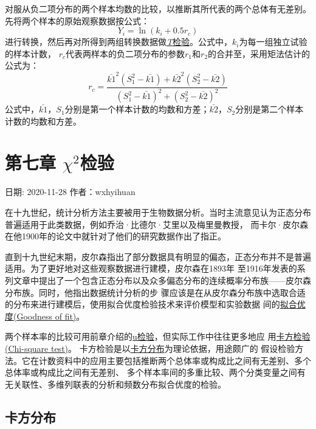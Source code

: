 \documentclass[
]{article}
\begin{document}
对服从负二项分布的两个样本均数的比较，以推断其所代表的两个总体有无差别。先将两个样本的原始观察数据按公式：
\[Y_i=\ln(k_i+0.5r_c)\]
进行转换，然后再对所得到两组转换数据做\protect\hyperlink{ux5355ux6837ux672ctux68c0ux9a8c}{\emph{T}检验}。公式中，\(k_i\)为每一组独立试验的样本计数，
\(r_c\)代表两样本的负二项分布的参数\(r_1\)和\(r_2\)的合并至，采用矩法估计的公式为：
\[r_c=\frac{\bar{k1}^2(S_1^2-\bar{k1})+\bar{k2}^2(S_2^2-\bar{k2})}{(S_1^2-\bar{k1})^2+(S_2^2-\bar{k2})^2}\]
公式中，\(\bar{k1}，S_1\)分别是第一个样本计数的均数和方差；\(\bar{k2}，S_2\)分别是第二个样本计数的均数和方差。

\hypertarget{ux7b2cux4e03ux7ae0-chi2ux68c0ux9a8c}{%
\section{\texorpdfstring{第七章 \(\chi^2\)检验}{第七章 \textbackslash chi\^{}2检验}}\label{ux7b2cux4e03ux7ae0-chi2ux68c0ux9a8c}}

日期: 2020-11-28
作者：wxhyihuan

在十九世纪，统计分析方法主要被用于生物数据分析。当时主流意见认为正态分布普遍适用于此类数据，例如乔治·比德尔·艾里以及梅里曼教授，
而卡尔·皮尔森在他1900年的论文中就针对了他们的研究数据作出了指正。

直到十九世纪末期，皮尔森指出了部分数据具有明显的偏态，正态分布并不是普遍适用。为了更好地对这些观察数据进行建模，皮尔森在1893年
至1916年发表的系列文章中提出了一个包含正态分布以及众多偏态分布的连续概率分布族------皮尔森分布族。同时，他指出数据统计分析的步
骤应该是在从皮尔森分布族中选取合适的分布来进行建模后，使用拟合优度检验技术来评价模型和实验数据
间的\href{https://en.wikipedia.org/wiki/Goodness_of_fit}{拟合优度(Goodness of fit)}。

两个样本率的比较可用前章介绍的\protect\hyperlink{ux4e24ux6837ux672cux7387ux7684ux6bd4ux8f83ux28ux6b63ux6001ux8fd1ux4f3cux29}{u检验}，但实际工作中往往更多地应
用\href{https://zh.wikipedia.org/wiki/\%E5\%8D\%A1\%E6\%96\%B9\%E6\%A3\%80\%E9\%AA\%8C}{卡方检验(Chi-square test)}。
卡方检验是以\href{https://zh.wikipedia.org/wiki/\%E5\%8D\%A1\%E6\%96\%B9\%E5\%88\%86\%E4\%BD\%88}{卡方分布}为理论依据，用途颇广的
假设检验方法。它在计数资料中的应用主要包括推断两个总体率或构成比之间有无差别、多个总体率或构成比之间有无差别、
多个样本率间的多重比较、两个分类变量之间有无关联性、多维列联表的分析和频数分布拟合优度的检验。

\hypertarget{ux5361ux65b9ux5206ux5e03}{%
\subsection{卡方分布}\label{ux5361ux65b9ux5206ux5e03}}
\end{document}

